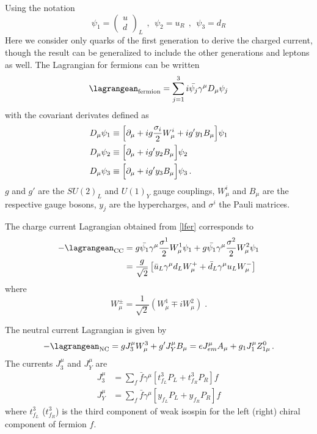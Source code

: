 Using the notation
\begin{equation}
\psi_1=\left(\begin{array}{c}
u \\ d    
\end{array}\right)_{L} \:\:,\:\:
\psi_2=u_R\:\:,\:\:\psi_3=d_{R}
\end{equation}
Here we consider only quarks of the first generation to derive the charged current, though the result can be generalized to include the other generations and leptons as well. The Lagrangian for fermions can be written 
\begin{equation}
\lagrangean_{\text{fermion}}=\sum_{j=1}^{3} i\bar{\psi_j}\gamma^\mu D_\mu\psi_j
\label{lfer}
\end{equation}
with the covariant derivates defined as
\begin{align*}
D_\mu\psi_1 & \equiv\Bigl[\partial_\mu+ig\frac{\sigma_i}{2}W_\mu^i+ig'y_1B_\mu \Bigr]\psi_1 \\
D_\mu\psi_2 & \equiv\Bigl[\partial_\mu                            +ig'y_2B_\mu \Bigr]\psi_2 \\
D_\mu\psi_3 & \equiv\Bigl[\partial_\mu                            +ig'y_3B_\mu \Bigr]\psi_3 \,.
\end{align*}
$g$ and $g'$ are the $SU(2)_L$ and $U(1)_Y$ gauge couplings, $W_\mu^i$ and $B_\mu$ are the respective gauge bosons, $y_j$ are the hypercharges, and $\sigma^i$ the Pauli matrices. 

The charge current Lagrangian obtained from \ref{lfer} corresponds to
\begin{align}
-\lagrangean_{\text{CC}}&=g\bar{\psi_1}\gamma^\mu \frac{\sigma^1}{2}W_\mu^1\psi_1 + g\bar{\psi_1}\gamma^\mu \frac{\sigma^2}{2}W_\mu^2\psi_1 \notag\\
&= \frac{g}{\sqrt{2}}\left[\bar{u}_L\gamma^\mu d_LW_\mu^{+} + \bar{d}_L\gamma^\mu u_L W_\mu^{-}\right] \label{lcc}
\end{align}
where 
\[
W_\mu^\pm=\frac{1}{\sqrt{2}} (W_\mu^1 \mp iW_\mu^2) \; . 
\]

The neutral current Lagrangian is given by
\begin{equation}
-\lagrangean_{\text{NC}} = gJ_3^\mu W_\mu^3 + g'J_Y^\mu B_\mu = eJ_{em}^\mu A_\mu + g_1J_1^\mu Z_{1\mu}^0\,. \label{lnc}
\end{equation}
The currents $J_3^\mu$ and $J_Y^\mu$ are
\begin{align}
J_3^\mu &= \sum_{f}\bar{f}\gamma^\mu [t_{f_L}^3P_L+t_{f_R}^3P_R]f \\
J_Y^\mu &= \sum_{f}\bar{f}\gamma^\mu [y_{f_L}  P_L+y_{f_R}  P_R]f 
\end{align}
where $t_{f_L}^3$ ($t_{f_R}^3$) is the third component of weak isospin for the left (right) chiral component of fermion $f$. 

